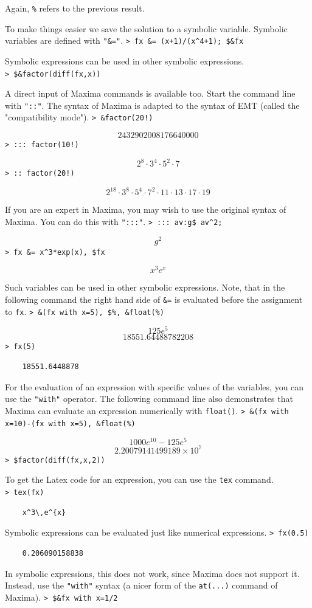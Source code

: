 \documentclass[11pt, a4paper]{article}
\newcommand{\emtcmd}[1]{\noindent\texttt{\textcolor{emtcommand}{>}\ #1}\par\smallskip}
\begin{document}
Again, \texttt{\%} refers to the previous result.

To make things easier we save the solution to a symbolic variable. Symbolic variables are defined with \texttt{"\&="}.
\emtcmd{fx \&= (x+1)/(x\^{}4+1); \$\&fx}

Symbolic expressions can be used in other symbolic expressions.
\emtcmd{\$\&factor(diff(fx,x))}

A direct input of Maxima commands is available too. Start the command line with \texttt{"::"}. The syntax of Maxima is adapted to the syntax of EMT (called the "compatibility mode").
\emtcmd{\&factor(20!)}
$$2432902008176640000$$
\emtcmd{::: factor(10!)}
$$2^8 \cdot 3^4 \cdot 5^2 \cdot 7$$
\emtcmd{:: factor(20!)}
$$2^{18} \cdot 3^8 \cdot 5^4 \cdot 7^2 \cdot 11 \cdot 13 \cdot 17 \cdot 19$$

If you are an expert in Maxima, you may wish to use the original syntax of Maxima. You can do this with \texttt{":::"}.
\emtcmd{::: av:g\$ av\^{}2;}
$$g^2$$
\emtcmd{fx \&= x\^{}3*exp(x), \$fx}
$$x^3 e^x$$

Such variables can be used in other symbolic expressions. Note, that in the following command the right hand side of \texttt{\&=} is evaluated before the assignment to \texttt{fx}.
\emtcmd{\&(fx with x=5), \$\%, \&float(\%)}
$$125 e^5$$
$$18551.64488782208$$
\emtcmd{fx(5)}
\begin{verbatim}
    18551.6448878
\end{verbatim}

For the evaluation of an expression with specific values of the variables, you can use the \texttt{"with"} operator. The following command line also demonstrates that Maxima can evaluate an expression numerically with \texttt{float()}.
\emtcmd{\&(fx with x=10)-(fx with x=5), \&float(\%)}
$$1000 e^{10} - 125 e^5$$
$$2.20079141499189 \times 10^7$$
\emtcmd{\$factor(diff(fx,x,2))}

To get the Latex code for an expression, you can use the \texttt{tex} command.
\emtcmd{tex(fx)}
\begin{verbatim}
    x^3\,e^{x}
\end{verbatim}

Symbolic expressions can be evaluated just like numerical expressions.
\emtcmd{fx(0.5)}
\begin{verbatim}
    0.206090158838
\end{verbatim}

In symbolic expressions, this does not work, since Maxima does not support it. Instead, use the \texttt{"with"} syntax (a nicer form of the \texttt{at(...)} command of Maxima).
\emtcmd{\$\&fx with x=1/2}
\end{document}

